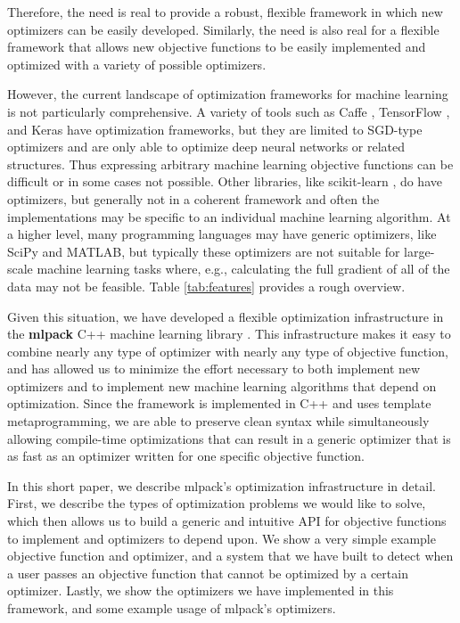\documentclass{article}
\begin{document}
Therefore, the need is real to provide a robust, flexible framework in which
new optimizers can be easily developed.  Similarly, the need is also real for a
flexible framework that allows new objective functions to be easily implemented
and optimized with a variety of possible optimizers.

However, the current landscape of optimization frameworks for machine learning
is not particularly comprehensive.  A variety of tools such as
Caffe \cite{jia2014caffe},
TensorFlow \cite{abadi2016tensorflow},
and
Keras \cite{chollet2015}
have optimization frameworks, but they are limited to SGD-type optimizers and
are only able to optimize deep neural networks or related structures.  Thus
expressing arbitrary machine learning objective functions can be difficult or in
some cases not possible.  Other libraries, like
scikit-learn \cite{pedregosa2011scikit},
do have optimizers, but generally not in a coherent framework and
often the implementations may be specific to an individual machine learning
algorithm.  At a higher level, many programming languages may have generic
optimizers, like SciPy \cite{jones2014scipy} and MATLAB, but typically these
optimizers are not suitable for large-scale machine learning tasks where, e.g.,
calculating the full gradient of all of the data may not be feasible.  Table
\ref{tab:features} provides a rough overview.

Given this situation, we have developed a flexible optimization infrastructure
in the {\bf mlpack} C++ machine learning library \cite{mlpack2013}.  This
infrastructure makes it easy to combine nearly any type of optimizer with nearly
any type of objective function, and has allowed us to minimize the effort
necessary to both implement new optimizers and to implement new machine learning
algorithms that depend on optimization.  Since the framework is implemented in
C++ and uses template metaprogramming, we are able to preserve clean syntax
while simultaneously allowing compile-time optimizations that can result in a
generic optimizer that is as fast as an optimizer written for one specific objective function.

In this short paper, we describe mlpack's optimization infrastructure in detail.
First, we describe the types of optimization problems we would like to solve,
which then allows us to build a generic and intuitive API for objective
functions to implement and optimizers to depend upon.  We show a very simple
example objective function and optimizer, and a system that we have built to
detect when a user passes an objective function that cannot be optimized by a
certain optimizer.  Lastly, we show the optimizers we have implemented in this
framework, and some example usage of mlpack's optimizers.
\end{document}
